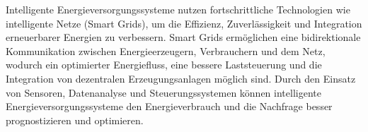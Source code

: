 Intelligente Energieversorgungssysteme nutzen fortschrittliche Technologien wie
intelligente Netze (Smart Grids), um die Effizienz, Zuverlässigkeit und
Integration erneuerbarer Energien zu verbessern. Smart Grids ermöglichen eine
bidirektionale Kommunikation zwischen Energieerzeugern, Verbrauchern und dem
Netz, wodurch ein optimierter Energiefluss, eine bessere Laststeuerung und die
Integration von dezentralen Erzeugungsanlagen möglich sind. Durch den Einsatz
von Sensoren, Datenanalyse und Steuerungssystemen können intelligente
Energieversorgungssysteme den Energieverbrauch und die Nachfrage besser
prognostizieren und optimieren.